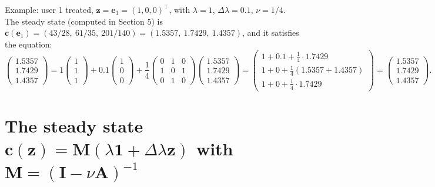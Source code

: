 \documentclass[11pt]{article}
\newcommand{\one}{\mathbf{1}}
\newcommand{\vc}{\boldsymbol{c}}
\newcommand{\vz}{\boldsymbol{z}}
\newcommand{\ve}{\boldsymbol{e}}
\newcommand{\mA}{\mathbf{A}}
\newcommand{\mM}{\mathbf{M}}
\newcommand{\mI}{\mathbf{I}}
\begin{document}
Example: user 1 treated, $\vz = \ve_1 = (1, 0, 0)^\top$, with $\lambda = 1$, $\Delta\lambda = 0.1$, $\nu = 1/4$.  The steady state (computed in Section 5) is $\vc(\ve_1) = (43/28,\ 61/35,\ 201/140) = (1.5357,\ 1.7429,\ 1.4357)$, and it satisfies the equation:
\[
\begin{pmatrix} 1.5357 \\ 1.7429 \\ 1.4357 \end{pmatrix}
=
1 \begin{pmatrix} 1 \\ 1 \\ 1 \end{pmatrix}
+ 0.1 \begin{pmatrix} 1 \\ 0 \\ 0 \end{pmatrix}
+ \frac14 \begin{pmatrix} 0 & 1 & 0 \\ 1 & 0 & 1 \\ 0 & 1 & 0 \end{pmatrix}
\begin{pmatrix} 1.5357 \\ 1.7429 \\ 1.4357 \end{pmatrix}
=
\begin{pmatrix} 1 + 0.1 + \frac14 \cdot 1.7429 \\[2pt] 1 + 0 + \frac14 (1.5357 + 1.4357) \\[2pt] 1 + 0 + \frac14 \cdot 1.7429 \end{pmatrix}
=
\begin{pmatrix} 1.5357 \\ 1.7429 \\ 1.4357 \end{pmatrix}.
\]

\section{The steady state $\vc(\vz) = \mM(\lambda\one + \Delta\lambda \vz)$ with $\mM = (\mI - \nu \mA)^{-1}$}
\end{document}
